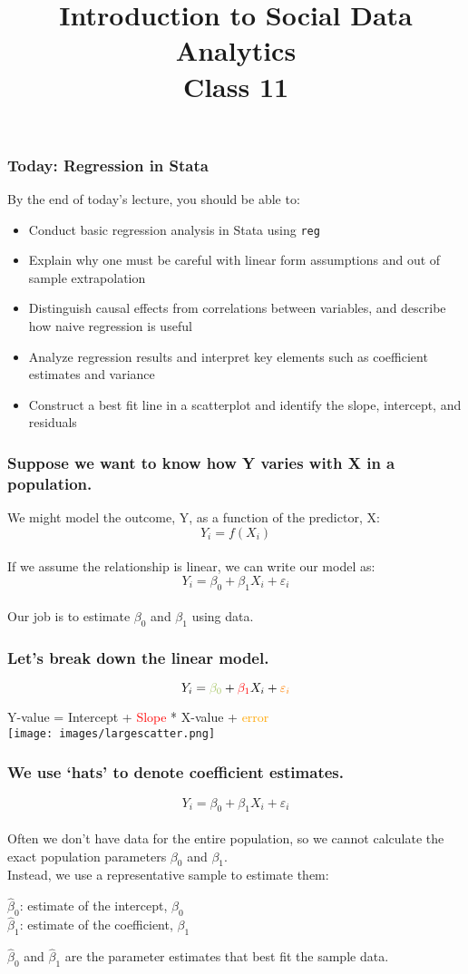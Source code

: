 \documentclass[11pt]{beamer}
\title[Class 11]{Introduction to Social Data Analytics \\
	\bigskip Class 11}
\author[]{}
\institute[UCSD]{}
\date{}
\newcommand{\red}{\textcolor{red}}
\newcommand{\orange}{\textcolor{orange}}
\newcommand{\greenn}{\textcolor{ao}}
\begin{document}
\frame{\titlepage}

\begin{frame}
\frametitle{Today: Regression in Stata}
By the end of today's lecture, you should be able to:
\begin{itemize} \itemsep1em
	\item Conduct basic regression analysis in Stata using \texttt{reg}
	\item Explain why one must be careful with linear form assumptions and out of sample extrapolation
	\item Distinguish causal effects from correlations between variables, and describe how naive regression is useful 
	\item Analyze regression results and interpret key elements such as coefficient estimates and variance
	\item Construct a best fit line in a scatterplot and identify the slope, intercept, and residuals
\end{itemize}
\end{frame}

\begin{frame}
\frametitle{Suppose we want to know how Y varies with X in a population.}
We might \alert{model} the outcome, Y, as a function of the predictor, X: \\
$$Y_i = f(X_i)$$ \\ \bigskip
If we assume the relationship is \alert{linear}, we can write our model as: \\
$$Y_i = \beta_0 + \beta_1X_i + \varepsilon_i $$ \\ \bigskip
Our job is to \alert{estimate} $\beta_0$ and $\beta_1$ using data. 
\end{frame}

\begin{frame}
\frametitle{Let's break down the linear model.}
$$Y_i = \greenn{\beta_0} + \red{\beta_1}X_i + \orange{\varepsilon_i} $$ 
\begin{center}
	Y-value = \greenn{Intercept} + \red{Slope} * X-value + \orange{error} \\ \bigskip
	\texttt{[image: images/largescatter.png]}
\end{center}
\end{frame}

\begin{frame}
\frametitle{We use `hats' to denote coefficient estimates.}
$$Y_i = \beta_0 + \beta_1X_i + \varepsilon_i $$ \\ \bigskip
Often we don't have data for the entire population, so we cannot calculate the exact population parameters $\beta_0$ and $\beta_1$. \\ \bigskip \pause
Instead, we use a representative sample to \alert{estimate} them: \\ \bigskip
\begin{center}
	$\hat{\beta}_0$: estimate of the intercept, $\beta_0$  \\
	$\hat{\beta}_1$: estimate of the coefficient, $\beta_1$  
\end{center} \pause \bigskip
$\hat{\beta}_0$ and $\hat{\beta}_1$ are the parameter estimates that \alert{best fit} the sample data. 
\end{frame}
\end{document}
